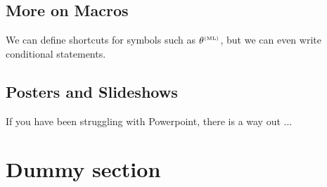 \documentclass[a4paper,10pt]{report} %
\begin{document}

\subsection{More on Macros} 
 We can define shortcuts for symbols such as \(\theta^{\scriptscriptstyle \mathrm{(ML)}}\), but we can even write conditional statements.
 
 \subsection{Posters and Slideshows} 
 If you have been struggling with Powerpoint, there is a way out \( \ldots \) 
 
 \section{Dummy section}
 \lipsum[2-7]    %
 
 
 
\label{LastPage}
\newpage
\end{document}

